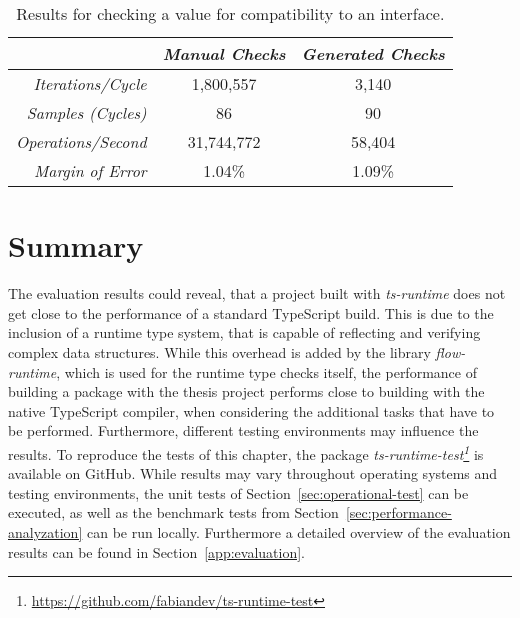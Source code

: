 \begin{table}[ht]
  \begin{subtable}[ht]{1.0\textwidth}
    \setlength{\tabcolsep}{5mm}
    \def\arraystretch{1.25}
    \centering
    \begin{tabular}{|r||c|c|}
      \hline
      & \emph{Manual Checks} & \emph{Generated Checks} \\
      \hline
      \hline
      \emph{Iterations/Cycle} & 1,800,557 & 3,140 \\
      \hline
      \emph{Samples (Cycles)} & 86 & 90 \\
      \hline
      \emph{Operations/Second} & 31,744,772 & 58,404 \\
      \hline
      \emph{Margin of Error} & 1.04\% & 1.09\% \\
      \hline
    \end{tabular}
    \caption{Results for checking a value for compatibility to an interface.}
    \label{tab:benchmarks:interface}
  \end{subtable}
\end{table}

\section{Summary}
\label{sec:evaluation-summary}

The evaluation results could reveal, that a project built with \emph{ts-runtime} does not get close to the performance of a standard TypeScript build. This is due to the inclusion of a runtime type system, that is capable of reflecting and verifying complex data structures. While this overhead is added by the library \emph{flow-runtime}, which is used for the runtime type checks itself, the performance of building a package with the thesis project performs close to building with the native TypeScript compiler, when considering the additional tasks that have to be performed. Furthermore, different testing environments may influence the results. To reproduce the tests of this chapter, the package \emph{ts-runtime-test\footnote{\url{https://github.com/fabiandev/ts-runtime-test}}} is available on GitHub. While results may vary throughout operating systems and testing environments, the unit tests of Section~\ref{sec:operational-test} can be executed, as well as the benchmark tests from Section~\ref{sec:performance-analyzation} can be run locally. Furthermore a detailed overview of the evaluation results can be found in Section~\ref{app:evaluation}.
